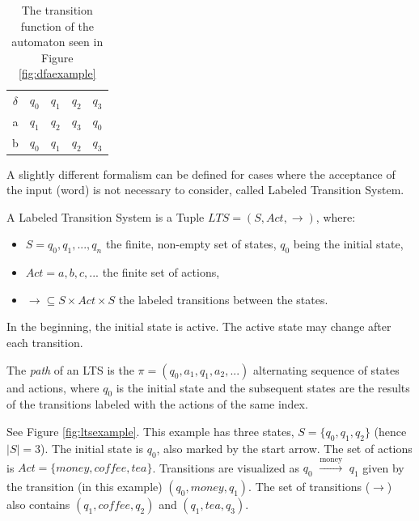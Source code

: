 \begin{table}[!ht]
	\centering
	\begin{tabular}{|c|cccc|}
		\hline
		$\delta$ & $q_0$ & $q_1$ & $q_2$ & $q_3$\\ \cline{1-5}
		a & $q_1$ & $q_2$ & $q_3$ & $q_0$ \\	
		b & $q_0$ & $q_1$ & $q_2$ & $q_3$ \\	\hline
	\end{tabular}
	\caption{The transition function of the automaton seen in Figure \ref{fig:dfaexample}}
	\label{tab:dfaexampledelta}
\end{table}

A slightly different formalism can be defined for cases where the acceptance of the input (word) is not necessary to consider, called Labeled Transition System.

\begin{definition}
	A Labeled Transition System is a Tuple $LTS=(S, Act, \rightarrow)$, where:
	\begin{itemize}
		\item $S={q_0, q_1, ..., q_n}$ the finite, non-empty set of states, $q_0$ being the initial state,
		\item $Act = {a, b, c, ...}$ the finite set of actions,
		\item $\rightarrow \subseteq S \times Act \times S$ the labeled transitions between the states.
	\end{itemize}
	In the beginning, the initial state is active. The active state may change after each transition.
	
	The \textit{path} of an LTS is the $\pi = (q_0, a_1, q_1, a_2, ...)$ alternating sequence of states and actions, where $q_0$ is the initial state and the subsequent states are the results of the transitions labeled with the actions of the same index. 
\end{definition}

\begin{example}
	\label{ex:ltsexample}
	See Figure \ref{fig:ltsexample}. This example has three states, $S = \{q_0, q_1, q_2\}$ (hence $|S| = 3$). The initial state is $q_0$, also marked by the start arrow. The set of actions is $Act = \{money, coffee, tea\}$. Transitions are visualized as $q_0$ $\xrightarrow[]{\text{money}}$ $q_1$ given by the transition (in this example) $(q_0, money, q_1)$. The set of transitions ($\rightarrow$) also contains $(q_1, coffee, q_2)$ and $(q_1, tea, q_3)$.
\end{example}

